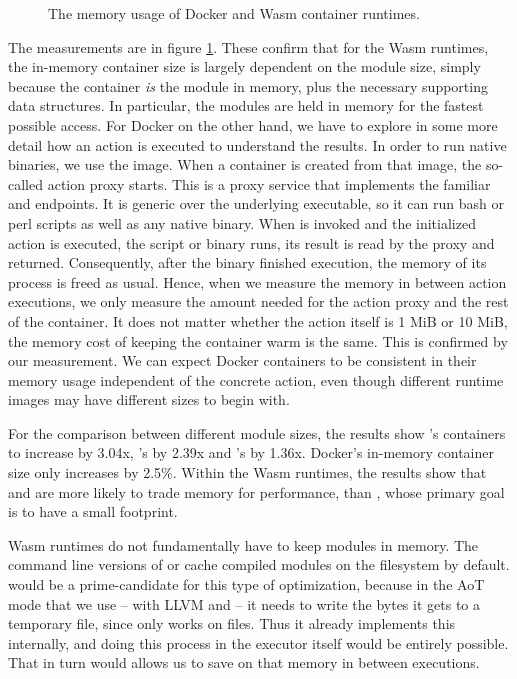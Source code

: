 \begin{figure}
    \begin{center}
        
    \end{center}
    \caption{The memory usage of Docker and Wasm container runtimes.}
    \label{fig:pc-memory}
\end{figure}

The measurements are in figure \ref{fig:pc-memory}. These confirm that for the Wasm runtimes, the in-memory container size is largely dependent on the module size, simply because the container \emph{is} the module in memory, plus the necessary supporting data structures. In particular, the modules are held in memory for the fastest possible access. For Docker on the other hand, we have to explore in some more detail how an action is executed to understand the results. In order to run native binaries, we use the  image. When a container is created from that image, the so-called action proxy starts. This is a proxy service that implements the familiar  and  endpoints. It is generic over the underlying executable, so it can run bash or perl scripts as well as any native binary. When  is invoked and the initialized action is executed, the script or binary runs, its result is read by the proxy and returned. Consequently, after the binary finished execution, the memory of its process is freed as usual. Hence, when we measure the memory in between action executions, we only measure the amount needed for the action proxy and the rest of the container. It does not matter whether the action itself is 1 MiB or 10 MiB, the memory cost of keeping the container warm is the same. This is confirmed by our measurement. We can expect Docker containers to be consistent in their memory usage independent of the concrete action, even though different runtime images may have different sizes to begin with.

For the comparison between different module sizes, the results show 's containers to increase by 3.04x, 's by 2.39x and 's by 1.36x. Docker's in-memory container size only increases by 2.5\%. Within the Wasm runtimes, the results show that  and  are more likely to trade memory for performance, than , whose primary goal is to have a small footprint.

Wasm runtimes do not fundamentally have to keep modules in memory. The command line versions of  or  cache compiled modules on the filesystem by default.  would be a prime-candidate for this type of optimization, because in the AoT mode that we use -- with LLVM and  -- it needs to write the bytes it gets to a temporary file, since  only works on files. Thus it already implements this internally, and doing this process in the executor itself would be entirely possible. That in turn would allows us to save on that memory in between executions.

